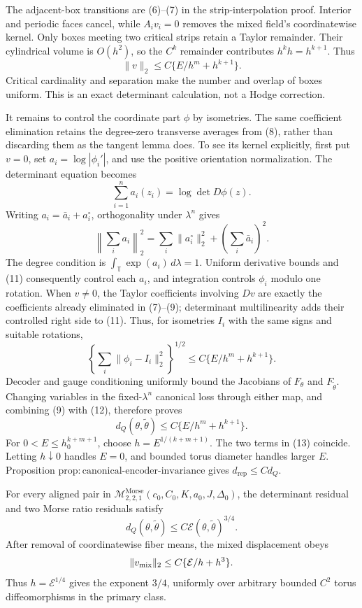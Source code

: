 The adjacent-box transitions are (6)--(7) in the strip-interpolation proof.  Interior and periodic faces cancel, while \(A_iv_i=0\) removes the mixed field's coordinatewise kernel.  Only boxes meeting two critical strips retain a Taylor remainder.  Their cylindrical volume is \(O(h^2)\), so the \(C^k\) remainder contributes \(h^k h=h^{k+1}\).  Thus
\[
 \lVert v\rVert_2\leq C\{E/h^m+h^{k+1}\}.
\tag{9}
\]
Critical cardinality and separation make the number and overlap of boxes uniform.  This is an exact determinant calculation, not a Hodge correction.

It remains to control the coordinate part \(\phi\) by isometries.  The same coefficient elimination retains the degree-zero transverse averages from (8), rather than discarding them as the tangent lemma does.  To see its kernel explicitly, first put \(v=0\), set \(a_i=\log|\phi_i'|\), and use the positive orientation normalization.  The determinant equation becomes
\[
 \sum_{i=1}^n a_i(z_i)=\log\det D\phi(z).
\tag{10}
\]
Writing \(a_i=\bar a_i+a_i^\circ\), orthogonality under \(\lambda^n\) gives
\[
 \left\lVert\sum_i a_i\right\rVert_2^2
 =\sum_i\lVert a_i^\circ\rVert_2^2+\left(\sum_i\bar a_i\right)^2.
\tag{11}
\]
The degree condition is \(\int_{\mathbb T}\exp(a_i)\,d\lambda=1\).  Uniform derivative bounds and (11) consequently control each \(a_i\), and integration controls \(\phi_i\) modulo one rotation.  When \(v\neq0\), the Taylor coefficients involving \(Dv\) are exactly the coefficients already eliminated in (7)--(9); determinant multilinearity adds their controlled right side to (11).  Thus, for isometries \(I_i\) with the same signs and suitable rotations,
\[
 \left\{\sum_i\lVert\phi_i-I_i\rVert_2^2\right\}^{1/2}
 \leq C\{E/h^m+h^{k+1}\}.
\tag{12}
\]
Decoder and gauge conditioning uniformly bound the Jacobians of \(F_\theta\) and \(F_{\widetilde\theta}\).  Changing variables in the fixed-\(\lambda^n\) canonical loss through either map, and combining (9) with (12), therefore proves
\[
 d_Q(\theta,\widetilde\theta)\leq C\{E/h^m+h^{k+1}\}.
\tag{13}
\]
For \(0<E\leq h_0^{k+m+1}\), choose \(h=E^{1/(k+m+1)}\).  The two terms in (13) coincide.  Letting \(h\downarrow0\) handles \(E=0\), and bounded torus diameter handles larger \(E\).  Proposition \(\mathrm{prop:canonical\text{-}encoder\text{-}invariance}\) gives \(d_{\mathrm{rep}}\leq C d_Q\).

For every aligned pair in \(\mathcal M^{\mathrm{Morse}}_{2,2,1}(c_0,C_0,K,a_0,J,\Delta_0)\), the determinant residual and two Morse ratio residuals satisfy
\[
 d_Q(\theta,\widetilde\theta)
 \leq C\mathcal E(\theta,\widetilde\theta)^{3/4}.
\]
After removal of coordinatewise fiber means, the mixed displacement obeys
\[
 \lVert v_{\rm mix}\rVert_2\leq C\{\mathcal E/h+h^3\}.
\]
Thus \(h=\mathcal E^{1/4}\) gives the exponent \(3/4\), uniformly over arbitrary bounded \(C^2\) torus diffeomorphisms in the primary class.

